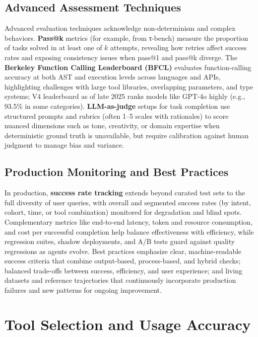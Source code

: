 \begin{TNtwocol}
\subsection*{Advanced Assessment Techniques}

Advanced evaluation techniques acknowledge non-determinism and complex behaviors. \textbf{Pass@k} metrics (for example, from τ-bench) measure the proportion of tasks solved in at least one of $k$ attempts, revealing how retries affect success rates and exposing consistency issues when pass@1 and pass@k diverge. The \textbf{Berkeley Function Calling Leaderboard (BFCL)} evaluates function-calling accuracy at both AST and execution levels across languages and APIs, highlighting challenges with large tool libraries, overlapping parameters, and type systems; V4 leaderboard as of late 2025 ranks models like GPT-4o highly (e.g., 93.5\% in some categories). \textbf{LLM-as-judge} setups for task completion use structured prompts and rubrics (often 1–5 scales with rationales) to score nuanced dimensions such as tone, creativity, or domain expertise when deterministic ground truth is unavailable, but require calibration against human judgment to manage bias and variance.

\subsection*{Production Monitoring and Best Practices}

In production, \textbf{success rate tracking} extends beyond curated test sets to the full diversity of user queries, with overall and segmented success rates (by intent, cohort, time, or tool combination) monitored for degradation and blind spots. Complementary metrics like end-to-end latency, token and resource consumption, and cost per successful completion help balance effectiveness with efficiency, while regression suites, shadow deployments, and A/B tests guard against quality regressions as agents evolve. Best practices emphasize clear, machine-readable success criteria that combine output-based, process-based, and hybrid checks; balanced trade-offs between success, efficiency, and user experience; and living datasets and reference trajectories that continuously incorporate production failures and new patterns for ongoing improvement.


\section{Tool Selection and Usage Accuracy}


\end{TNtwocol}
